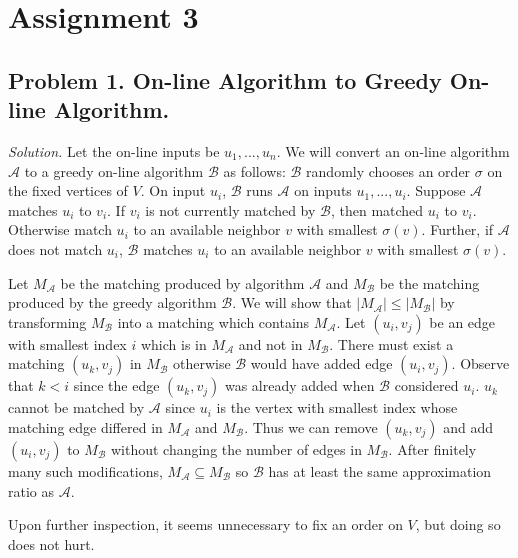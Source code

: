 \documentclass[11pt]{article}
\newcommand\AlgA{\mathcal{A}}
\newcommand\AlgB{\mathcal{B}}
\begin{document}
\rhead{\today}

\section*{Assignment 3}

\subsection*{Problem 1. On-line Algorithm to Greedy On-line Algorithm.}
\emph{Solution.} Let the on-line inputs be $u_1, ..., u_n$. We will convert an on-line algorithm $\AlgA$ to a greedy on-line algorithm $\AlgB$ as follows: $\AlgB$ randomly chooses an order $\sigma$ on the fixed vertices of $V$. On input $u_i$, $\AlgB$ runs $\AlgA$ on inputs $u_1, ..., u_i$. Suppose $\AlgA$ matches $u_i$ to $v_i$. If $v_i$ is not currently matched by $\AlgB$, then matched $u_i$ to $v_i$. Otherwise match $u_i$ to an available neighbor $v$ with smallest $\sigma(v)$. Further, if $\AlgA$ does not match $u_i$, $\AlgB$ matches $u_i$ to an available neighbor $v$ with smallest $\sigma(v)$.

Let $M_{\AlgA}$ be the matching produced by algorithm $\AlgA$ and $M_{\AlgB}$ be the matching produced by the greedy algorithm $\AlgB$. We will show that $|M_{\AlgA}| \leq |M_{\AlgB}|$ by transforming $M_{\AlgB}$ into a matching which contains $M_{\AlgA}$. Let $(u_i, v_j)$ be an edge with smallest index $i$ which is in $M_{\AlgA}$ and not in $M_{\AlgB}$. There must exist a matching $(u_k, v_j)$ in $M_{\AlgB}$ otherwise $\AlgB$ would have added edge $(u_i, v_j)$. Observe that $k < i$ since the edge $(u_k, v_j)$ was already added when $\AlgB$ considered $u_i$. $u_k$ cannot be matched by $\AlgA$ since $u_i$ is the vertex with smallest index whose matching edge differed in $M_{\AlgA}$ and $M_{\AlgB}$. Thus we can remove $(u_k, v_j)$ and add $(u_i, v_j)$ to $M_{\AlgB}$ without changing the number of edges in $M_{\AlgB}$. After finitely many such modifications, $M_{\AlgA} \subseteq M_{\AlgB}$ so $\AlgB$ has at least the same approximation ratio as $\AlgA$.

Upon further inspection, it seems unnecessary to fix an order on $V$, but doing so does not hurt.
\end{document}

